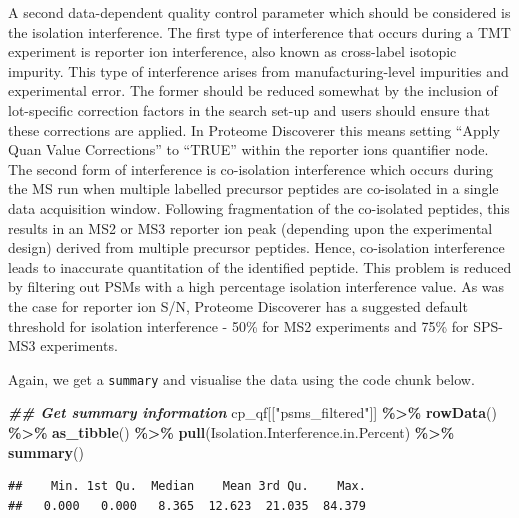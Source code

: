 \documentclass[9pt,a4paper,]{extarticle}
\newenvironment{Shaded}{\begin{snugshade}}{\end{snugshade}}
\newcommand{\DocumentationTok}[1]{\textcolor[rgb]{0.56,0.35,0.01}{\textbf{\textit{#1}}}}
\newcommand{\FunctionTok}[1]{\textcolor[rgb]{0.13,0.29,0.53}{\textbf{#1}}}
\newcommand{\NormalTok}[1]{#1}
\newcommand{\SpecialCharTok}[1]{\textcolor[rgb]{0.81,0.36,0.00}{\textbf{#1}}}
\newcommand{\StringTok}[1]{\textcolor[rgb]{0.31,0.60,0.02}{#1}}
\begin{document}
A second data-dependent quality control parameter which should be considered is
the isolation interference. The first type of interference that occurs during a
TMT experiment is reporter ion interference, also known as cross-label isotopic
impurity. This type of interference arises from manufacturing-level impurities
and experimental error. The former should be reduced somewhat by the inclusion
of lot-specific correction factors in the search set-up and users should ensure
that these corrections are applied. In Proteome Discoverer this means setting
``Apply Quan Value Corrections'' to ``TRUE'' within the reporter ions quantifier
node. The second form of interference is co-isolation interference which occurs
during the MS run when multiple labelled precursor peptides are co-isolated in a
single data acquisition window. Following fragmentation of the co-isolated
peptides, this results in an MS2 or MS3 reporter ion peak (depending upon the
experimental design) derived from multiple precursor peptides. Hence,
co-isolation interference leads to inaccurate quantitation of the identified
peptide. This problem is reduced by filtering out PSMs with a high percentage
isolation interference value. As was the case for reporter ion S/N, Proteome
Discoverer has a suggested default threshold for isolation interference - 50\%
for MS2 experiments and 75\% for SPS-MS3 experiments.

Again, we get a \texttt{summary} and visualise the data using the code chunk below.

\begin{Shaded}
\begin{Highlighting}[]
\DocumentationTok{\#\# Get summary information}
\NormalTok{cp\_qf[[}\StringTok{"psms\_filtered"}\NormalTok{]] }\SpecialCharTok{\%\textgreater{}\%} 
  \FunctionTok{rowData}\NormalTok{() }\SpecialCharTok{\%\textgreater{}\%} 
  \FunctionTok{as\_tibble}\NormalTok{() }\SpecialCharTok{\%\textgreater{}\%} 
  \FunctionTok{pull}\NormalTok{(Isolation.Interference.in.Percent) }\SpecialCharTok{\%\textgreater{}\%} 
  \FunctionTok{summary}\NormalTok{()}
\end{Highlighting}
\end{Shaded}

\begin{verbatim}
##    Min. 1st Qu.  Median    Mean 3rd Qu.    Max. 
##   0.000   0.000   8.365  12.623  21.035  84.379
\end{verbatim}
\end{document}
